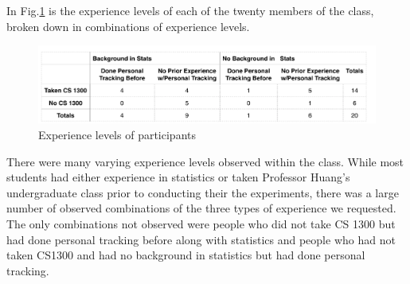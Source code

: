 In Fig.\ref{fig:table} is the experience levels of each of the twenty members of the class, broken down in combinations of experience levels. 

\begin{figure}[!t]\centering
\includegraphics[width=1.0\columnwidth]{images/Backgrounds_of_Students.PNG}
\caption{\footnotesize Experience levels of participants \label{fig:table} 
}%
\end{figure}

There were many varying experience levels observed within the class.  While most students had either experience in statistics or taken Professor Huang’s undergraduate class prior to conducting their the experiments, there was a large number of observed combinations of the three types of experience we requested. The only combinations not observed were people who did not take CS 1300 but had done personal tracking before along with statistics and people who had not taken CS1300 and had no background in statistics but had done personal tracking.
